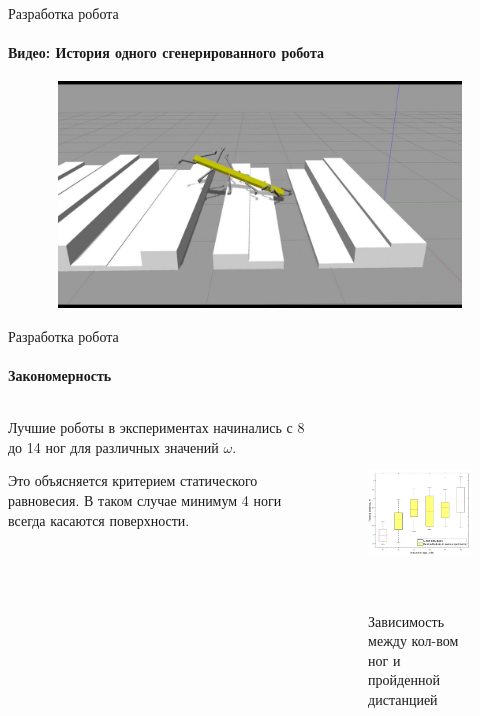 \documentclass[aspectratio=169,xcolor=table,10pt]{beamer}
\begin{document}
\begin{frame}[t]{Разработка робота}
    \framesubtitle{Видео: История одного сгенерированного робота}
    \vspace{-0.6cm}
    \begin{figure}[H]
        \href{https://youtu.be/DcovvkTZgsg}{
            \centering\includegraphics[height=6cm,width=1\textwidth,keepaspectratio]{genetic_video_preview.jpg}}
    \end{figure}
\end{frame}


\begin{frame}[t]{Разработка робота}
    \framesubtitle{Закономерность}
    \begin{columns}[T,onlytextwidth]
        \begin{column}{0.49\textwidth}
            Лучшие роботы в экспериментах начинались с 8 до 14 ног для различных значений $\omega$.

            Это объясняется критерием статического равновесия. В таком случае минимум 4 ноги всегда касаются поверхности.
        \end{column}
        \begin{column}{0.49\textwidth}
            \vspace{-1.8cm}
            \begin{figure}[H]
                \centering\includegraphics[height=5cm,width=1\textwidth,keepaspectratio]{box_plot_structural_synthesis.png}
                \caption*{Зависимость между кол-вом ног и пройденной дистанцией}
                \label{fig:box_plot_structural_synthesis.png}
            \end{figure}
        \end{column}
    \end{columns}
\end{frame}
\end{document}
